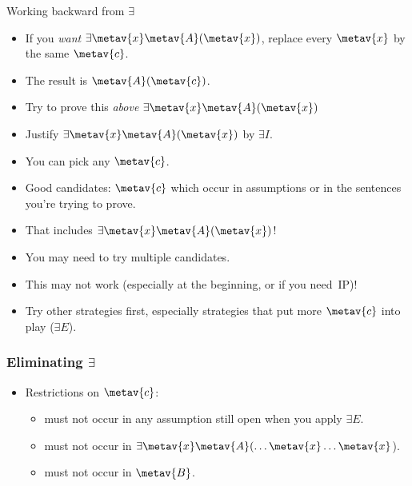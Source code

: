 \begin{frame}{Working backward from $\exists$}

  \begin{itemize}[<+->]
    \item If you \emph{want} $\exists \metav{x}\metav{A}(\metav{x})$, replace every $\metav{x}$ by the
      same $\metav{c}$.
    \item The result is $\metav{A}(\metav{c})$. 
    \item Try to prove this \emph{above} $\exists \metav{x}\metav{A}(\metav{x})$
    \item Justify $\exists \metav{x}\metav{A}(\metav{x})$ by $\exists I$.
    \item You can pick any $\metav{c}$.
    \item Good candidates: $\metav{c}$ which occur in assumptions or
      in the sentences you're trying to prove.
    \item That includes $\exists \metav{x}\metav{A}(\metav{x})$!
    \item You may need to try multiple candidates.
    \item This may not work (especially at the beginning, or if
    you need~IP)!
    \item Try other strategies first, especially strategies that put
    more $\metav{c}$ into play ($\exists E$).
    \end{itemize}
\end{frame}

\begin{frame}
  \frametitle{Eliminating $\exists$}
  \begin{fitchproof}
    \open
    \close
  \end{fitchproof}

  \begin{itemize}[<+->]
    \item Restrictions on $\metav{c}$:
    \begin{itemize}[<+->]
      \item must not occur in any assumption still open when you apply
      $\exists E$.
      \item must not occur in $\exists \metav{x}\metav{A}(\ldots \metav{x} \ldots \metav{x}$).
      \item must not occur in $\metav{B}$.
    \end{itemize}
  \end{itemize}
  \end{frame}

